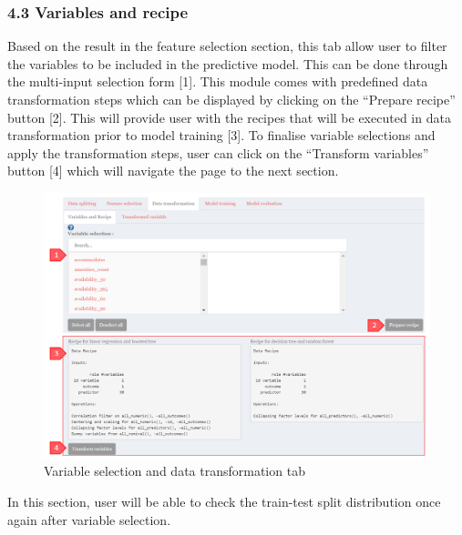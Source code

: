\documentclass[
  12pt,
]{article}
\begin{document}
\hypertarget{variables-and-recipe}{%
\subsubsection{4.3 Variables and recipe}\label{variables-and-recipe}}

Based on the result in the feature selection section, this tab allow
user to filter the variables to be included in the predictive model.
This can be done through the multi-input selection form {[}1{]}. This
module comes with predefined data transformation steps which can be
displayed by clicking on the ``Prepare recipe'' button {[}2{]}. This
will provide user with the recipes that will be executed in data
transformation prior to model training {[}3{]}. To finalise variable
selections and apply the transformation steps, user can click on the
``Transform variables'' button {[}4{]} which will navigate the page to
the next section.

\begin{figure}[H]

{\centering \includegraphics[width=0.95\linewidth]{images/datatrf1} 

}

\caption{Variable selection and data transformation tab}\label{fig:unnamed-chunk-14}
\end{figure}

In this section, user will be able to check the train-test split
distribution once again after variable selection.
\end{document}
